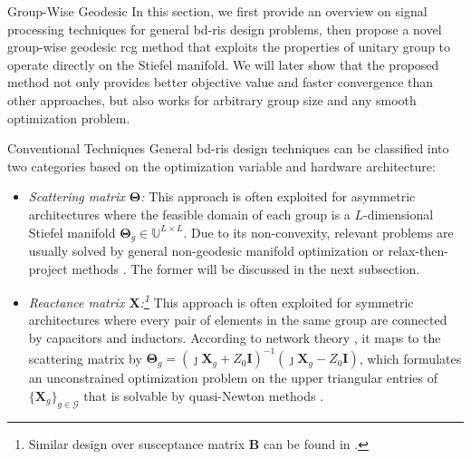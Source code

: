 \documentclass[journal]{IEEEtran}
\begin{document}
\begin{section}{Group-Wise Geodesic }
	In this section, we first provide an overview on signal processing techniques for general \gls{bd}-\gls{ris} design problems, then propose a novel group-wise geodesic \gls{rcg} method that exploits the properties of unitary group to operate directly on the Stiefel manifold.
	We will later show that the proposed method not only provides better objective value and faster convergence than other approaches, but also works for arbitrary group size and any smooth optimization problem.
	\begin{subsection}{Conventional Techniques}
		General \gls{bd}-\gls{ris} design techniques can be classified into two categories based on the optimization variable and hardware architecture:
		\begin{itemize}
			\item \emph{Scattering matrix $\mathbf{\Theta}$:} This approach is often exploited for asymmetric architectures where the feasible domain of each group is a $L$-dimensional Stiefel manifold $\mathbf{\Theta}_g \in \mathbb{U}^{L \times L}$. Due to its non-convexity, relevant problems are usually solved by general non-geodesic manifold optimization \cite{Li2023b,Li2023c,Bartoli2023} or relax-then-project methods \cite{Fang2023}. The former will be discussed in the next subsection.
			\item \emph{Reactance matrix $\mathbf{X}$:\footnote{Similar design over susceptance matrix $\mathbf{B}$ can be found in \cite{Nerini2024}.}} This approach is often exploited for symmetric architectures where every pair of elements in the same group are connected by capacitors and inductors. According to network theory \cite{Pozar2011}, it maps to the scattering matrix by $\mathbf{\Theta}_g = (\jmath \mathbf{X}_g + Z_0 \mathbf{I})^{-1} (\jmath \mathbf{X}_g - Z_0 \mathbf{I})$, which formulates an unconstrained optimization problem on the upper triangular entries of $\{\mathbf{X}_g\}_{g \in \mathcal{G}}$ that is solvable by quasi-Newton methods \cite{Shen2020a}.
		\end{itemize}
	\end{subsection}


\end{section}
\end{document}
